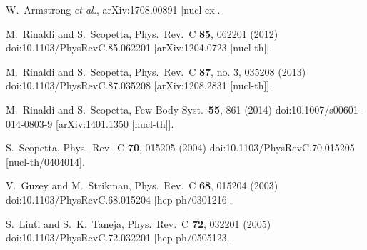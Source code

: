 \documentclass[twocolumn]{revtex4}
\begin{document}
\begin{thebibliography}{25}
  W.~Armstrong {\it et al.},
  arXiv:1708.00891 [nucl-ex].

  M.~Rinaldi and S.~Scopetta,
  Phys.\ Rev.\ C {\bf 85}, 062201 (2012)
  doi:10.1103/PhysRevC.85.062201
  [arXiv:1204.0723 [nucl-th]].


  M.~Rinaldi and S.~Scopetta,
  Phys.\ Rev.\ C {\bf 87}, no. 3, 035208 (2013)
  doi:10.1103/PhysRevC.87.035208
  [arXiv:1208.2831 [nucl-th]].

  M.~Rinaldi and S.~Scopetta,
  Few Body Syst.\  {\bf 55}, 861 (2014)
  doi:10.1007/s00601-014-0803-9
  [arXiv:1401.1350 [nucl-th]].

  S.~Scopetta,
  Phys.\ Rev.\ C {\bf 70}, 015205 (2004)
  doi:10.1103/PhysRevC.70.015205
  [nucl-th/0404014].

  V.~Guzey and M.~Strikman,
  Phys.\ Rev.\ C {\bf 68}, 015204 (2003)
  doi:10.1103/PhysRevC.68.015204
  [hep-ph/0301216].

  S.~Liuti and S.~K.~Taneja,
  Phys.\ Rev.\ C {\bf 72}, 032201 (2005)
  doi:10.1103/PhysRevC.72.032201
  [hep-ph/0505123].


\end{thebibliography}
\end{document}
